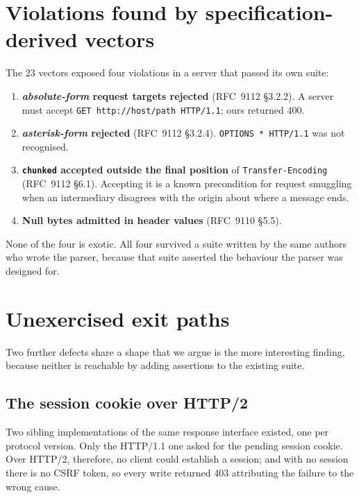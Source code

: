 \documentclass[preprint,12pt]{elsarticle}
\begin{document}
\section{Violations found by specification-derived vectors}
\label{sec:violations}

The 23 vectors exposed four violations in a server that passed its own suite:

\begin{enumerate}
  \item \textbf{\emph{absolute-form} request targets rejected} (RFC~9112 §3.2.2).
        A server must accept \texttt{GET http://host/path HTTP/1.1}; ours
        returned 400.
  \item \textbf{\emph{asterisk-form} rejected} (RFC~9112 §3.2.4).
        \texttt{OPTIONS * HTTP/1.1} was not recognised.
  \item \textbf{\texttt{chunked} accepted outside the final position} of
        \texttt{Transfer-Encoding} (RFC~9112 §6.1). Accepting it is a known
        precondition for request smuggling when an intermediary disagrees with
        the origin about where a message ends.
  \item \textbf{Null bytes admitted in header values} (RFC~9110 §5.5).
\end{enumerate}

None of the four is exotic. All four survived a suite written by the same
authors who wrote the parser, because that suite asserted the behaviour the
parser was designed for.

\section{Unexercised exit paths}
\label{sec:exitpaths}

Two further defects share a shape that we argue is the more interesting
finding, because neither is reachable by adding assertions to the existing
suite.

\subsection{The session cookie over HTTP/2}

Two sibling implementations of the same response interface existed, one per
protocol version. Only the HTTP/1.1 one asked for the pending session cookie.
Over HTTP/2, therefore, no client could establish a session; and with no
session there is no CSRF token, so every write returned 403 attributing the
failure to the wrong cause.
\end{document}
